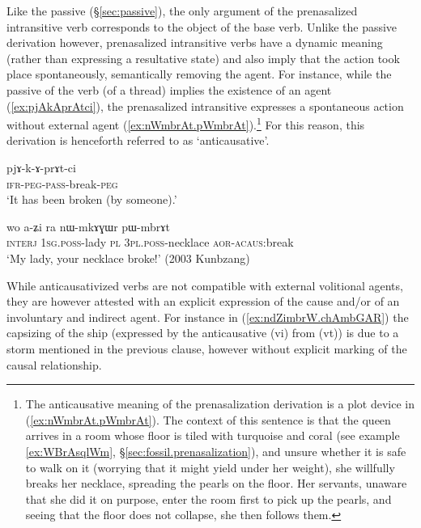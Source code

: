 Like the passive (§\ref{sec:passive}), the only argument of the prenasalized intransitive verb corresponds to the object of the base verb. Unlike the passive derivation however, prenasalized intransitive verbs have a dynamic meaning (rather than expressing a resultative state) and also imply that the action took place spontaneously, semantically removing the agent. For instance, while the passive  of the verb  (of a thread) implies the existence of an agent (\ref{ex:pjAkAprAtci}), the prenasalized intransitive  expresses a spontaneous action without external agent (\ref{ex:nWmbrAt.pWmbrAt}).\footnote{The anticausative meaning of the prenasalization derivation is a plot device in (\ref{ex:nWmbrAt.pWmbrAt}). The context of this sentence is that the queen arrives in a room whose floor is tiled with turquoise and coral (see example \ref{ex:WBrAsqlWm}, §\ref{sec:fossil.prenasalization}), and unsure whether it is safe to walk on it (worrying that it might yield under her weight), she willfully breaks her necklace, spreading the pearls on the floor. Her servants, unaware that she did it on purpose, enter the room first to pick up the pearls, and seeing that the floor does not collapse, she then follows them. } For this reason, this derivation is henceforth referred to as `anticausative'.
 

\begin{exe}
\ex \label{ex:pjAkAprAtci}
\gll pjɤ-k-ɤ-prɤt-ci \\
\textsc{ifr}-\textsc{peg}-\textsc{pass}-break-\textsc{peg} \\
\glt `It has been broken (by someone).' 
\end{exe}

\begin{exe}
\ex \label{ex:nWmbrAt.pWmbrAt}
\gll  wo a-ʑi ra nɯ-mkɤɣɯr pɯ-mbrɤt \\
\textsc{interj} \textsc{1sg}.\textsc{poss}-lady \textsc{pl} \textsc{3pl}.\textsc{poss}-necklace \textsc{aor}-\textsc{acaus}:break \\
\glt `My lady, your necklace broke!' (2003 Kunbzang)
\end{exe}
 
While anticausativized verbs are not compatible with external volitional agents, they are however attested with an explicit expression of the cause and/or of an involuntary and indirect agent. For instance in (\ref{ex:ndZimbrW.chAmbGAR}) the capsizing of the ship (expressed by the anticausative  (vi) from  (vt)) is due to a storm mentioned in the previous clause, however without explicit marking of the causal relationship.  

